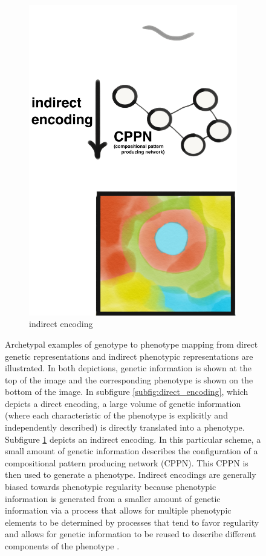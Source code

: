 \begin{figure}[!htbp]
\begin{subfigure}[b]{0.4\textwidth}
        \includegraphics[width=\textwidth]{img/regular_indirect_encoding.png}
        \caption{indirect encoding}
        \label{subfig:indirect_encoding}
    \end{subfigure}
    \hfill
  \captionsetup{singlelinecheck=off,justification=raggedright}
  \caption{Archetypal examples of genotype to phenotype mapping from direct genetic representations and indirect phenotypic representations are illustrated. In both depictions, genetic information is shown at the top of the image and the corresponding phenotype is shown on the bottom of the image. In subfigure \ref{subfig:direct_encoding}, which depicts a direct encoding, a large volume of genetic information (where each characteristic of the phenotype is explicitly and independently described) is directly translated into a phenotype. Subfigure \ref{subfig:indirect_encoding} depicts an indirect encoding. In this particular scheme, a small amount of genetic information describes the configuration of a compositional pattern producing network (CPPN). This CPPN is then used to generate a phenotype. Indirect encodings are generally biased towards phenotypic regularity because phenotypic information is generated from a smaller amount of genetic information via a process that allows for multiple phenotypic elements to be determined by processes that tend to favor regularity and allows for genetic information to be reused to describe different components of the phenotype  \cite{Clune2011OnRegularity}.}
  \label{fig:indirect_bias}
\end{figure}